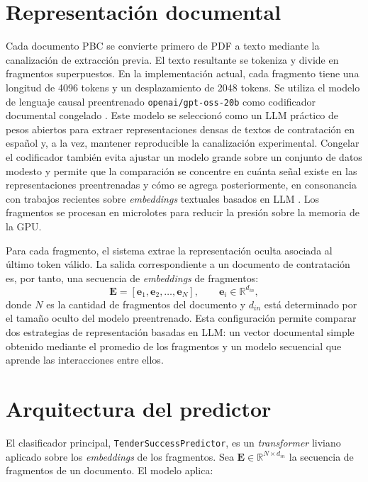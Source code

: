\ifdefined\metodoComoSubsecciones
  \let\seccionMetodo\subsection
\else
  \let\seccionMetodo\section
\fi

\seccionMetodo{Representación documental}
Cada documento PBC se convierte primero de PDF a texto mediante la canalización de extracción previa. El texto resultante se tokeniza y divide en fragmentos superpuestos. En la implementación actual, cada fragmento tiene una longitud de 4096 tokens y un desplazamiento de 2048 tokens. Se utiliza el modelo de lenguaje causal preentrenado \texttt{openai/gpt-oss-20b} como codificador documental congelado \parencite{agarwal2025gptoss}. Este modelo se seleccionó como un LLM práctico de pesos abiertos para extraer representaciones densas de textos de contratación en español y, a la vez, mantener reproducible la canalización experimental. Congelar el codificador también evita ajustar un modelo grande sobre un conjunto de datos modesto y permite que la comparación se concentre en cuánta señal existe en las representaciones preentrenadas y cómo se agrega posteriormente, en consonancia con trabajos recientes sobre \textit{embeddings} textuales basados en LLM \parencite{wang2024improvingembeddings}. Los fragmentos se procesan en microlotes para reducir la presión sobre la memoria de la GPU.

Para cada fragmento, el sistema extrae la representación oculta asociada al último token válido. La salida correspondiente a un documento de contratación es, por tanto, una secuencia de \textit{embeddings} de fragmentos:
\[
\mathbf{E} = [\mathbf{e}_1, \mathbf{e}_2, \dots, \mathbf{e}_N], \qquad \mathbf{e}_i \in \mathbb{R}^{d_{in}},
\]
donde $N$ es la cantidad de fragmentos del documento y $d_{in}$ está determinado por el tamaño oculto del modelo preentrenado. Esta configuración permite comparar dos estrategias de representación basadas en LLM: un vector documental simple obtenido mediante el promedio de los fragmentos y un modelo secuencial que aprende las interacciones entre ellos.

\seccionMetodo{Arquitectura del predictor}
El clasificador principal, \texttt{TenderSuccessPredictor}, es un \textit{transformer} liviano aplicado sobre los \textit{embeddings} de los fragmentos. Sea $\mathbf{E} \in \mathbb{R}^{N \times d_{in}}$ la secuencia de fragmentos de un documento. El modelo aplica:

